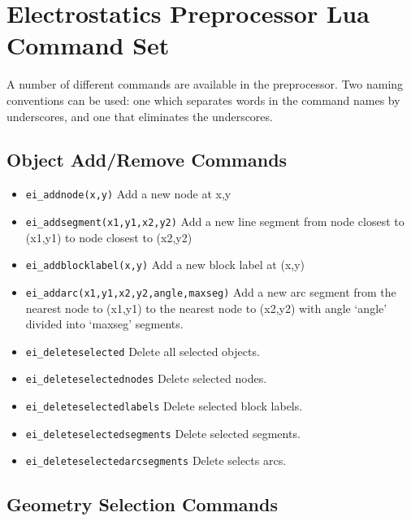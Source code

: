 \section{Electrostatics Preprocessor Lua Command Set}

A number of different commands are available in the preprocessor.
Two naming conventions can be used: one which separates words in
the command names by underscores, and one that eliminates the
underscores.

\subsection{Object Add/Remove Commands}
\begin{itemize}
\item {\tt ei\_addnode(x,y)} Add a new node at x,y

\item {\tt ei\_addsegment(x1,y1,x2,y2)} Add a new line segment from node closest to
(x1,y1) to node closest to (x2,y2)

\item {\tt ei\_addblocklabel(x,y)} Add a new block label at (x,y)

\item {\tt ei\_addarc(x1,y1,x2,y2,angle,maxseg)} Add a new arc segment from the
nearest node to (x1,y1) to the nearest node to (x2,y2) with angle `angle'
divided into `maxseg' segments.

\item {\tt ei\_deleteselected} Delete all selected objects.

\item {\tt ei\_deleteselectednodes} Delete selected nodes.

\item {\tt ei\_deleteselectedlabels} Delete selected block labels.

\item {\tt ei\_deleteselectedsegments} Delete selected segments.

\item {\tt ei\_deleteselectedarcsegments} Delete selects arcs.
\end{itemize}


\subsection{Geometry Selection Commands}

